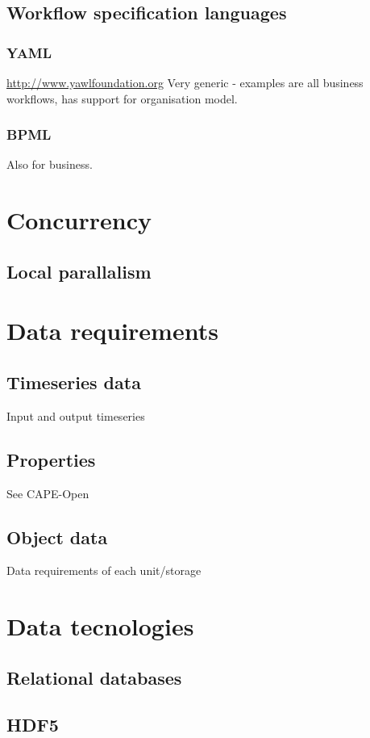 \subsection{Workflow specification languages}

\subsubsection{YAML}
\url{http://www.yawlfoundation.org} Very generic - examples are all
business workflows, has support for organisation model.  

\subsubsection{BPML}
Also for business.

\section{Concurrency}
\subsection{Local parallalism}

\section{Data requirements}
\subsection{Timeseries data}
Input and output timeseries

\subsection{Properties}
See CAPE-Open

\subsection{Object data}
Data requirements of each unit/storage

\section{Data tecnologies}
\subsection{Relational databases}
\subsection{HDF5}



